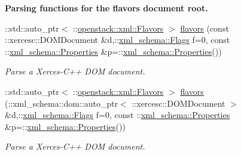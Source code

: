 \begin{Indent}{\bf Parsing functions for the flavors document root.}
\begin{DoxyCompactItemize}
::std::auto\_\-ptr$<$ ::\hyperlink{classopenstack_1_1xml_1_1Flavors}{openstack::xml::Flavors} $>$ \hyperlink{namespaceopenstack_1_1xml_aae11a1d5865a1bf5e2f122747597ee15}{flavors} (const ::xercesc::DOMDocument \&d,::\hyperlink{namespacexml__schema_affb4c227cbd9aa7453dd1dc5a1401943}{xml\_\-schema::Flags} f=0, const ::\hyperlink{namespacexml__schema_ad27ce19a7ee1d3b1064092648898f64c}{xml\_\-schema::Properties} \&p=::\hyperlink{namespacexml__schema_ad27ce19a7ee1d3b1064092648898f64c}{xml\_\-schema::Properties}())
\begin{DoxyCompactList}\small\item\em Parse a Xerces-\/C++ DOM document. \item\end{DoxyCompactList}\item 
::std::auto\_\-ptr$<$ ::\hyperlink{classopenstack_1_1xml_1_1Flavors}{openstack::xml::Flavors} $>$ \hyperlink{namespaceopenstack_1_1xml_acb30e1b74c506703589dacde4048103f}{flavors} (::xml\_\-schema::dom::auto\_\-ptr$<$ ::xercesc::DOMDocument $>$ \&d,::\hyperlink{namespacexml__schema_affb4c227cbd9aa7453dd1dc5a1401943}{xml\_\-schema::Flags} f=0, const ::\hyperlink{namespacexml__schema_ad27ce19a7ee1d3b1064092648898f64c}{xml\_\-schema::Properties} \&p=::\hyperlink{namespacexml__schema_ad27ce19a7ee1d3b1064092648898f64c}{xml\_\-schema::Properties}())
\begin{DoxyCompactList}\small\item\em Parse a Xerces-\/C++ DOM document. \item\end{DoxyCompactList}\end{DoxyCompactItemize}
\end{Indent}
